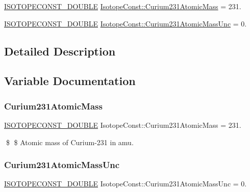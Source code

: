 \begin{DoxyCompactItemize}
\item 
\mbox{\hyperlink{group___isotope_const-_macros_ga8f45a7272ce02c0b4c65c44636ed719a}{I\+S\+O\+T\+O\+P\+E\+C\+O\+N\+S\+T\+\_\+\+D\+O\+U\+B\+LE}} \mbox{\hyperlink{group___isotope_const-_curium-_cm231_ga35f2f36c38eafb426718892b1c8495c1}{Isotope\+Const\+::\+Curium231\+Atomic\+Mass}} = 231.
\item 
\mbox{\hyperlink{group___isotope_const-_macros_ga8f45a7272ce02c0b4c65c44636ed719a}{I\+S\+O\+T\+O\+P\+E\+C\+O\+N\+S\+T\+\_\+\+D\+O\+U\+B\+LE}} \mbox{\hyperlink{group___isotope_const-_curium-_cm231_gaab843ffc58a79960edbf35b9dcb93073}{Isotope\+Const\+::\+Curium231\+Atomic\+Mass\+Unc}} = 0.
\end{DoxyCompactItemize}


\subsection{Detailed Description}


\subsection{Variable Documentation}
\mbox{\label{group___isotope_const-_curium-_cm231_ga35f2f36c38eafb426718892b1c8495c1}} 
\subsubsection{\texorpdfstring{Curium231\+Atomic\+Mass}{Curium231AtomicMass}}
{\footnotesize\ttfamily \mbox{\hyperlink{group___isotope_const-_macros_ga8f45a7272ce02c0b4c65c44636ed719a}{I\+S\+O\+T\+O\+P\+E\+C\+O\+N\+S\+T\+\_\+\+D\+O\+U\+B\+LE}} Isotope\+Const\+::\+Curium231\+Atomic\+Mass = 231.}

\$ \$ Atomic mass of Curium-\/231 in amu. \mbox{\label{group___isotope_const-_curium-_cm231_gaab843ffc58a79960edbf35b9dcb93073}} 
\subsubsection{\texorpdfstring{Curium231\+Atomic\+Mass\+Unc}{Curium231AtomicMassUnc}}
{\footnotesize\ttfamily \mbox{\hyperlink{group___isotope_const-_macros_ga8f45a7272ce02c0b4c65c44636ed719a}{I\+S\+O\+T\+O\+P\+E\+C\+O\+N\+S\+T\+\_\+\+D\+O\+U\+B\+LE}} Isotope\+Const\+::\+Curium231\+Atomic\+Mass\+Unc = 0.}

